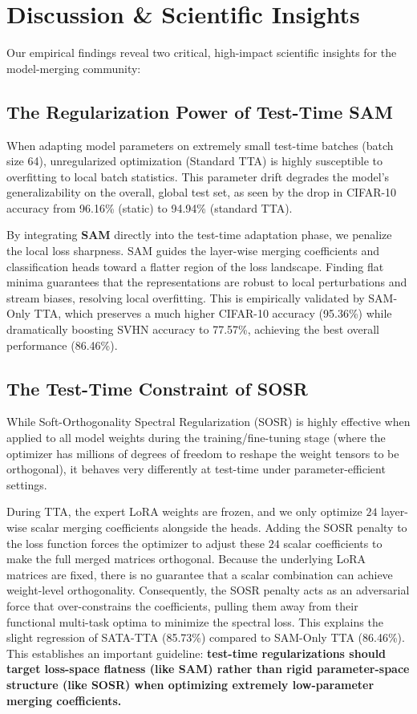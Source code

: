 \documentclass{article}
\theoremstyle{plain}
\theoremstyle{definition}
\theoremstyle{remark}
\begin{document}
\section{Discussion \& Scientific Insights}
\label{submission-discussion}

Our empirical findings reveal two critical, high-impact scientific insights for the model-merging community:

\subsection{The Regularization Power of Test-Time SAM}

When adapting model parameters on extremely small test-time batches (batch size 64), unregularized optimization (Standard TTA) is highly susceptible to overfitting to local batch statistics. This parameter drift degrades the model's generalizability on the overall, global test set, as seen by the drop in CIFAR-10 accuracy from 96.16\% (static) to 94.94\% (standard TTA).

By integrating \textbf{SAM} directly into the test-time adaptation phase, we penalize the local loss sharpness. SAM guides the layer-wise merging coefficients and classification heads toward a flatter region of the loss landscape. Finding flat minima guarantees that the representations are robust to local perturbations and stream biases, resolving local overfitting. This is empirically validated by SAM-Only TTA, which preserves a much higher CIFAR-10 accuracy (95.36\%) while dramatically boosting SVHN accuracy to 77.57\%, achieving the best overall performance (86.46\%).

\subsection{The Test-Time Constraint of SOSR}

While Soft-Orthogonality Spectral Regularization (SOSR) is highly effective when applied to all model weights during the training/fine-tuning stage (where the optimizer has millions of degrees of freedom to reshape the weight tensors to be orthogonal), it behaves very differently at test-time under parameter-efficient settings.

During TTA, the expert LoRA weights are frozen, and we only optimize $24$ layer-wise scalar merging coefficients alongside the heads. Adding the SOSR penalty to the loss function forces the optimizer to adjust these $24$ scalar coefficients to make the full merged matrices orthogonal. Because the underlying LoRA matrices are fixed, there is no guarantee that a scalar combination can achieve weight-level orthogonality. Consequently, the SOSR penalty acts as an adversarial force that over-constrains the coefficients, pulling them away from their functional multi-task optima to minimize the spectral loss. This explains the slight regression of SATA-TTA (85.73\%) compared to SAM-Only TTA (86.46\%). This establishes an important guideline: \textbf{test-time regularizations should target loss-space flatness (like SAM) rather than rigid parameter-space structure (like SOSR) when optimizing extremely low-parameter merging coefficients.}
\end{document}
